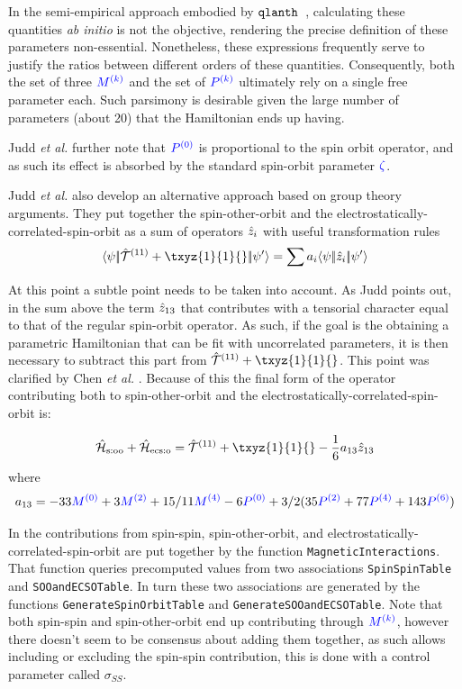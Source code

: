 \documentclass{article}
\newcommand{\codetext}[1]{{\color{BlueViolet} \texttt{#1}}}
\begin{document}
In the semi-empirical approach embodied by $\texttt{qlanth }$, calculating these quantities \textit{ab initio} is not the objective, rendering the precise definition of these parameters non-essential. Nonetheless, these expressions frequently serve to justify the ratios between different orders of these quantities. Consequently, both the set of three $\textcolor{blue}{M^{(k)}}$ and the set of $\textcolor{blue}{P^{(k)}}$ ultimately rely on a single free parameter each. Such parsimony is desirable given the large number of parameters (about 20) that the Hamiltonian ends up having.

Judd \textit{et al.} further note that $\textcolor{blue}{P^{(0)}}$ is proportional to the spin orbit operator, and as such its effect is absorbed by the standard spin-orbit parameter $\textcolor{blue}{{\zeta}}$.

Judd \textit{et al.} also develop an alternative approach based on group theory arguments. They put together the spin-other-orbit and the electrostatically-correlated-spin-orbit as a sum of operators $\hat{z}_i$ with useful transformation rules 
\begin{equation}
\redbraopket{\psi}{\Txyz{1}{1}{} + \txyz{1}{1}{}}{\psi'} = \sum a_i \redbraopket{\psi}{\hat{z}_i}{\psi'}
\end{equation}

At this point a subtle point needs to be taken into account. As Judd points out, in the sum above the term $\hat{z}_{13}$ that contributes with a tensorial character equal to that of the regular spin-orbit operator. As such, if the goal is the obtaining a parametric Hamiltonian that can be fit with uncorrelated parameters, it is then necessary to  subtract this part from $\Txyz{1}{1}{} + \txyz{1}{1}{}$. This point was clarified by Chen \textit{et al.} \cite{chen_few_2008}. Because of this the final form of the operator contributing both to spin-other-orbit and the electrostatically-correlated-spin-orbit is:

\begin{equation}
\hamSpinOtherOrbitSymbol + \hamECSOSymbol = \Txyz{1}{1}{} + \txyz{1}{1}{} - \frac{1}{6}a_{13}\op{z}_{13}
\label{SOO ECSO sum}
\end{equation}
where
\begin{equation}
a_{13} = -33 \textcolor{blue}{M^{(0)}} + 3 \textcolor{blue}{M^{(2)}} + 15/11 \textcolor{blue}{M^{(4)}} - 6 \textcolor{blue}{P^{(0)}} + 3/2 (35 \textcolor{blue}{P^{(2)}} + 77 \textcolor{blue}{P^{(4)}} + 143 \textcolor{blue}{P^{(6)}})
\end{equation}

In \qlanth the contributions from spin-spin, spin-other-orbit, and electrostatically-correlated-spin-orbit are put together by the function \codetext{MagneticInteractions}. That function queries precomputed values from two associations \codetext{SpinSpinTable} and \codetext{SOOandECSOTable}. In turn these two associations are generated by the functions \codetext{GenerateSpinOrbitTable} and \codetext{GenerateSOOandECSOTable}. Note that both spin-spin and spin-other-orbit end up contributing through $\textcolor{blue}{M^{(k)}}$, however there doesn't seem to be consensus about adding them together, as such \qlanth allows including or excluding the spin-spin contribution, this is done with a control parameter called $\sigma_{SS}$.
\end{document}
